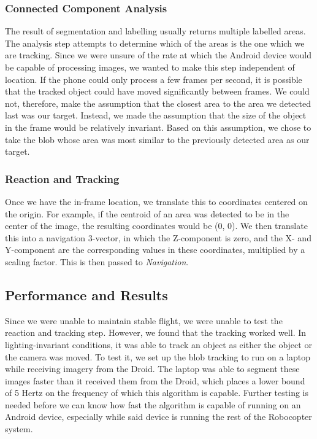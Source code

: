 \documentclass[letterpaper]{article}
\begin{document}
\subsubsection{Connected Component Analysis}
The result of segmentation and labelling usually returns multiple
labelled areas. The analysis step attempts to determine which of the
areas is the one which we are tracking. Since we were unsure of the
rate at which the Android device would be capable of processing
images, we wanted to make this step independent of location. If the
phone could only process a few frames per second, it is possible that
the tracked object could have moved significantly between frames. We
could not, therefore, make the assumption that the closest area to the
area we detected last was our target. Instead, we made the assumption
that the size of the object in the frame would be relatively
invariant. Based on this assumption, we chose to take the blob whose
area was most similar to the previously detected area as our target.

\subsubsection{Reaction and Tracking}
Once we have the in-frame location, we translate this to coordinates
centered on the origin. For example, if the centroid of an area was
detected to be in the center of the image, the resulting coordinates
would be (0, 0). We then translate this into a navigation 3-vector, in
which the Z-component is zero, and the X- and Y-component are the
corresponding values in these coordinates, multiplied by a scaling
factor. This is then passed to \emph{Navigation}.

\subsection{Performance and Results}
Since we were unable to maintain stable flight, we were unable to test
the reaction and tracking step. However, we found that the tracking
worked well. In lighting-invariant conditions, it was able to track an
object as either the object or the camera was moved. To test it, we
set up the blob tracking to run on a laptop while receiving imagery
from the Droid. The laptop was able to segment these images faster
than it received them from the Droid, which places a lower bound of 5
Hertz on the frequency of which this algorithm is capable. Further
testing is needed before we can know how fast the algorithm is capable
of running on an Android device, especially while said device is
running the rest of the Robocopter system.
\end{document}
